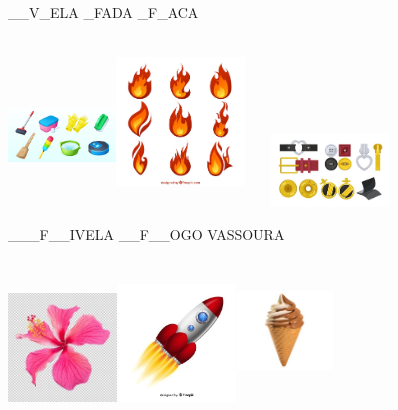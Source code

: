 \_\_V\_ELA \_FADA \_F\_ACA

\includegraphics[width=1.12500in,height=1.48958in]{media/image10.jpeg}\includegraphics[width=1.34375in,height=1.77083in]{media/image11.jpeg}\includegraphics[width=1.77847in,height=0.76369in]{media/image12.jpeg}

\_\_\_F\_\_IVELA \_\_F\_\_OGO VASSOURA

\includegraphics[width=1.13542in,height=1.13542in]{media/image13.jpeg}\includegraphics[width=1.24653in,height=1.22917in]{media/image14.jpeg}\includegraphics[width=1.00000in,height=1.49583in]{media/image15.jpeg}

